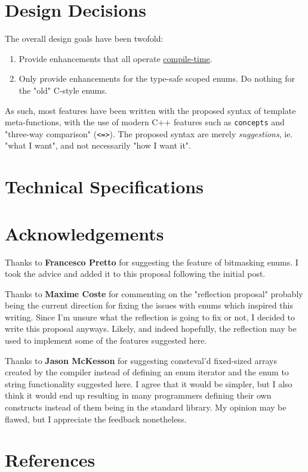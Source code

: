 \documentclass[
  format=manuscript,
  screen=true,
  review=false,
  nonacm=true,
  timestamp=true,
  balance=false]{acmart}
\begin{document}
\section{Design Decisions}

The overall design goals have been twofold:

\begin{enumerate}
\item Provide enhancements that all operate \underline{compile-time}.
\item Only provide enhancements for the type-safe scoped enums. Do nothing for the "old" C-style enums.
\end{enumerate}

\noindent
As such, most features have been written with the proposed syntax of template
meta-functions, with the use of modern C++ features such as \texttt{concepts} and
"three-way comparison" (\texttt{<=>}). The proposed syntax are merely
\textit{suggestions}, ie. "what I want", and not necessarily "how I want it".


\section{Technical Specifications}

\section{Acknowledgements}

Thanks to \textbf{Francesco Pretto} for suggesting the feature of bitmasking enums.
I took the advice and added it to this proposal following the initial post.

\noindent
Thanks to \textbf{Maxime Coste} for commenting on the "reflection proposal" probably
being the current direction for fixing the issues with enums which inspired this writing.
Since I'm unsure what the reflection is going to fix or not, I decided to write this
proposal anyways. Likely, and indeed hopefully, the reflection may be used to
implement some of the features suggested here.

\noindent
Thanks to \textbf{Jason McKesson} for suggesting consteval'd fixed-sized arrays created
by the compiler instead of defining an enum iterator and the enum to string functionality
suggested here. I agree that it would be simpler, but I also think it would end up
resulting in many programmers defining their own constructs instead of them being
in the standard library. My opinion may be flawed, but I appreciate the feedback
nonetheless.


\section{References}




\end{document}
